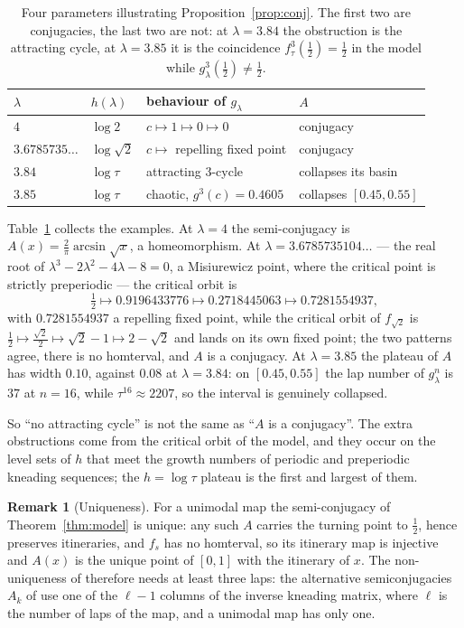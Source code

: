 \documentclass[11pt]{article}
\theoremstyle{plain}
\theoremstyle{definition}
\newtheorem{remark}[theorem]{Remark}
\begin{document}
\begin{table}[htbp]
  \centering\small
  \begin{tabular}{@{}llll@{}}
    \toprule
    $\lambda$ & $h(\lambda)$ & behaviour of $g_\lambda$ & $A$ \\
    \midrule
    $4$ & $\log2$ & $c\mapsto1\mapsto0\mapsto0$ & conjugacy \\
    $3.6785735\ldots$ & $\log\sqrt2$ & $c\mapsto$ repelling fixed point & conjugacy \\
    $3.84$ & $\log\tau$ & attracting $3$-cycle & collapses its basin \\
    $3.85$ & $\log\tau$ & chaotic, $g^3(c)=0.4605$ & collapses $[0.45,0.55]$ \\
    \bottomrule
  \end{tabular}
  \caption{Four parameters illustrating Proposition~\ref{prop:conj}.  The first two are
  conjugacies, the last two are not: at $\lambda=3.84$ the obstruction is the attracting
  cycle, at $\lambda=3.85$ it is the coincidence $f_\tau^3(\tfrac12)=\tfrac12$ in the
  model while $g_\lambda^3(\tfrac12)\ne\tfrac12$.}
  \label{tab:conj}
\end{table}

Table~\ref{tab:conj} collects the examples.  At $\lambda=4$ the semi-conjugacy is
$A(x)=\tfrac2\pi\arcsin\sqrt x$, a homeomorphism.  At
$\lambda=3.6785735104\ldots$ --- the real root of $\lambda^3-2\lambda^2-4\lambda-8=0$, a
Misiurewicz point, where the critical point is strictly preperiodic ---
the critical orbit is
\[
  \tfrac12\longmapsto0.9196433776\longmapsto0.2718445063\longmapsto0.7281554937,
\]
with $0.7281554937$ a repelling fixed point, while the critical orbit of $f_{\sqrt2}$ is
$\tfrac12\mapsto\tfrac{\sqrt2}{2}\mapsto\sqrt2-1\mapsto2-\sqrt2$ and lands on its own fixed point;
the two patterns agree, there is no homterval, and $A$ is a conjugacy.  At $\lambda=3.85$ the
plateau of $A$ has width $0.10$, against $0.08$ at $\lambda=3.84$: on $[0.45,0.55]$ the lap
number of $g_\lambda^n$ is $37$ at $n=16$, while $\tau^{16}\approx2207$, so the interval is
genuinely collapsed.

So ``no attracting cycle'' is not the same as ``$A$ is a conjugacy''.  The extra obstructions
come from the critical orbit of the model, and they occur on the level sets of $h$ that meet
the growth numbers of periodic and preperiodic kneading sequences; the $h=\log\tau$
plateau is the first and largest of them.

\begin{remark}[Uniqueness]\label{rem:unique}
For a unimodal map the semi-conjugacy of Theorem~\ref{thm:model} is unique: any such $A$
carries the turning point to $\tfrac12$, hence preserves itineraries, and $f_s$ has no
homterval, so its itinerary map is injective and $A(x)$ is the unique point of $[0,1]$ with
the itinerary of $x$.  The non-uniqueness of \cite[\S7.8]{MT} therefore needs at least three
laps: the alternative semiconjugacies $A_k$ of \cite[\S7.8]{MT} use one of the $\ell-1$
columns of the inverse kneading matrix, where $\ell$ is the number of laps of the map, and a
unimodal map has only one.
\end{remark}
\end{document}
